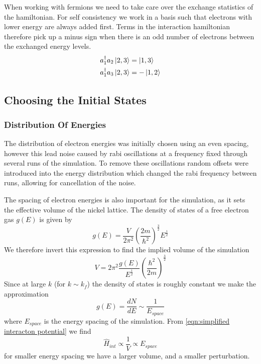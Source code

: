 When working with
fermions we need to take
care over the exchange
statistics of the hamiltonian.
For self consistency we work in
a basis such that electrons
with lower energy are always
added first. Terms in the interaction
hamiltonian therefore pick
up a minus sign when there is
an odd number of electrons
between the exchanged energy levels.
\begin{align}
    a^\dagger_1a_2 \ket{2,3} & = \ket{1,3}  \\
    a^\dagger_1a_3 \ket{2,3} & = -\ket{1,2}
\end{align}

\subsection{Choosing the Initial States}

\subsubsection{Distribution Of Energies}
The distribution of electron energies was
initially chosen using an even spacing,
however this lead noise caused
by rabi oscillations
at a frequency
fixed through several runs
of the simulation.
To remove these oscillations
random offsets were introduced
into the energy distribution
which changed the rabi frequency
between runs,
allowing for cancellation
of the noise.

The spacing of electron energies is also
important for the simulation, as it
sets the effective volume of the nickel
lattice. The density of states of a free electron
gas \(g(E)\) is given by~\cite{KittelCharles1953Itss}
\begin{equation}
    g(E) = \frac{V}{2\pi^2}
    {(\frac{2m}{\hbar^2})}^{\frac{3}{2}}
    E^{\frac{1}{2}}
\end{equation}
We therefore invert this expression
to find the implied volume of the
simulation
\begin{equation}
    V = 2\pi^2
    \frac{g(E)}{E^{\frac{1}{2}}}
    {(\frac{\hbar^2}{2m})}^{\frac{3}{2}}
\end{equation}
Since at large \(k\)
(for \(k\sim k_f\))
the density of states is roughly
constant we make the approximation
\begin{equation}
    g(E) = \frac{dN}{dE} \sim \frac{1}{E_{space}}
\end{equation}
where \(E_{space}\) is the energy spacing
of the simulation. From \cref{eqn:simplified interacton potential} we find
\begin{equation}
    \hat{H}_{int} \propto \frac{1}{V} \propto E_{space}
    \label{eqn:energy spacing dependance of interaction hamiltonian}
\end{equation}
for smaller
energy spacing we have
a larger volume, and a smaller
perturbation.

